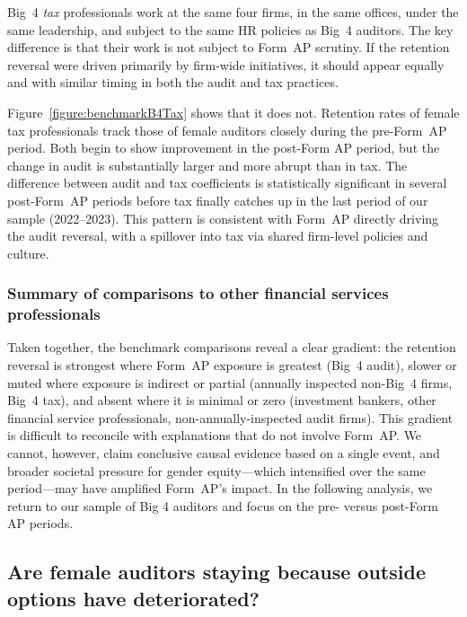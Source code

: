 \documentclass[11pt]{article}
\begin{document}
            Big~4 \textit{tax} professionals work at the same four firms, in the same offices, under the same leadership, and subject to the same HR policies as Big~4 auditors. The key difference is that their work is not subject to Form~AP scrutiny. If the retention reversal were driven primarily by firm-wide initiatives, it should appear equally and with similar timing in both the audit and tax practices.

            Figure~\ref{figure:benchmarkB4Tax} shows that it does not. Retention rates of female tax professionals track those of female auditors closely during the pre-Form~AP period. Both begin to show improvement in the post-Form AP period, but the change in audit is substantially larger and more abrupt than in tax. The difference between audit and tax coefficients is statistically significant in several post-Form~AP periods before tax finally catches up in the last period of our sample (2022--2023). This pattern is consistent with Form~AP directly driving the audit reversal, with a spillover into tax via shared firm-level policies and culture.

        \subsubsection{Summary of comparisons to other financial services professionals}

            Taken together, the benchmark comparisons reveal a clear gradient: the retention reversal is strongest where Form~AP exposure is greatest (Big~4 audit), slower or muted where exposure is indirect or partial (annually inspected non-Big~4 firms, Big~4 tax), and absent where it is minimal or zero (investment bankers, other financial service professionals, non-annually-inspected audit firms). This gradient is difficult to reconcile with explanations that do not involve Form~AP. We cannot, however, claim conclusive causal evidence based on a single event, and broader societal pressure for gender equity---which intensified over the same period---may have amplified Form~AP's impact. In the following analysis, we return to our sample of Big 4 auditors and focus on the pre- versus post-Form AP periods. 

    \subsection{Are female auditors staying because outside options have deteriorated?}\label{section:outsideOptions}
\end{document}
